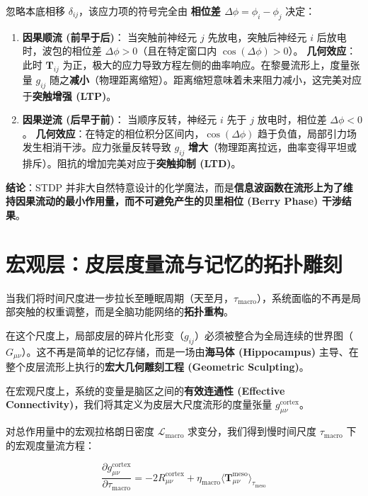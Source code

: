 忽略本底相移 $\delta_{ij}$，该应力项的符号完全由 \textbf{相位差 $\Delta \phi = \phi_i - \phi_j$} 决定：

\begin{enumerate}
    \item \textbf{因果顺流 (前早于后)}：
    当突触前神经元 $j$ 先放电，突触后神经元 $i$ 后放电时，波包的相位差 $\Delta \phi > 0$（且在特定窗口内 $\cos(\Delta \phi) > 0$）。
    \textbf{几何效应}：此时 $\mathbf{T}_{ij}$ 为正，极大的应力导致方程左侧的曲率响应。在黎曼流形上，度量张量 $g_{ij}$ 随之\textbf{减小}（物理距离缩短）。距离缩短意味着未来阻力减小，这完美对应于\textbf{突触增强 (LTP)}。

    \item \textbf{因果逆流 (后早于前)}：
    当顺序反转，神经元 $i$ 先于 $j$ 放电时，相位差 $\Delta \phi < 0$。
    \textbf{几何效应}：在特定的相位积分区间内，$\cos(\Delta \phi)$ 趋于负值，局部引力场发生相消干涉。应力张量反转导致 $g_{ij}$ \textbf{增大}（物理距离拉远，曲率变得平坦或排斥）。阻抗的增加完美对应于\textbf{突触抑制 (LTD)}。
\end{enumerate}

\textbf{结论}：STDP 并非大自然特意设计的化学魔法，而是\textbf{信息波函数在流形上为了维持因果流动的最小作用量，而不可避免产生的贝里相位 (Berry Phase) 干涉结果}。

\section{宏观层：皮层度量流与记忆的拓扑雕刻}
\label{sec:macro_cortical_metric_flow_and_consolidation}

当我们将时间尺度进一步拉长至睡眠周期（天至月，$\tau_{\text{macro}}$），系统面临的不再是局部突触的权重调整，而是全脑功能网络的\textbf{拓扑重构}。

在这个尺度上，局部皮层的碎片化形变（$g_{ij}$）必须被整合为全局连续的世界图（$G_{\mu\nu}$）。这不再是简单的记忆存储，而是一场由\textbf{海马体 (Hippocampus)} 主导、在整个皮层流形上执行的\textbf{宏大几何雕刻工程 (Geometric Sculpting)}。


在宏观尺度上，系统的变量是脑区之间的\textbf{有效连通性 (Effective Connectivity)}，我们将其定义为皮层大尺度流形的度量张量 $g_{\mu\nu}^{\text{cortex}}$。

对总作用量中的宏观拉格朗日密度 $\mathcal{L}_{\text{macro}}$ 求变分，我们得到慢时间尺度 $\tau_{\text{macro}}$ 下的宏观度量流方程：

\begin{equation}
    \frac{\partial g_{\mu\nu}^{\text{cortex}}}{\partial \tau_{\text{macro}}} = -2 R_{\mu\nu}^{\text{cortex}} + \eta_{\text{macro}} \langle \mathbf{T}_{\mu\nu}^{\text{meso}} \rangle_{\tau_{\text{meso}}}
\end{equation}

